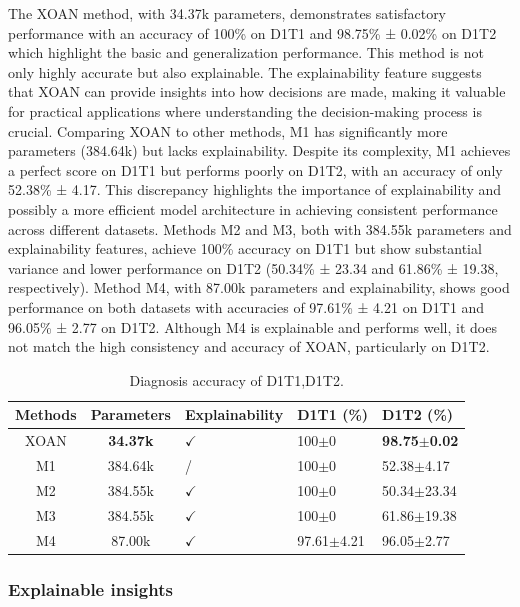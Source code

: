 \documentclass[lettersize,journal]{IEEEtran}
\begin{document}
The XOAN method, with 34.37k parameters, demonstrates satisfactory performance with an accuracy of 100\% on D1T1 and 98.75\% ± 0.02\% on D1T2 which highlight the basic and generalization performance. This method is not only highly accurate but also explainable. The explainability feature suggests that XOAN can provide insights into how decisions are made, making it valuable for practical applications where understanding the decision-making process is crucial. Comparing XOAN to other methods, M1 has significantly more parameters (384.64k) but lacks explainability. Despite its complexity, M1 achieves a perfect score on D1T1 but performs poorly on D1T2, with an accuracy of only 52.38\% ± 4.17. This discrepancy highlights the importance of explainability and possibly a more efficient model architecture in achieving consistent performance across different datasets. Methods M2 and M3, both with 384.55k parameters and explainability features, achieve 100\% accuracy on D1T1 but show substantial variance and lower performance on D1T2 (50.34\% ± 23.34 and 61.86\% ± 19.38, respectively). Method M4, with 87.00k parameters and explainability, shows good performance on both datasets with accuracies of 97.61\% ± 4.21 on D1T1 and 96.05\% ± 2.77 on D1T2. Although M4 is explainable and performs well, it does not match the high consistency and accuracy of XOAN, particularly on D1T2.

\begin{table}
    \centering
\caption{Diagnosis accuracy of D1T1,D1T2.}
\label{table.signaldomain}
    \begin{tabular}{cclll} \hline  
         Methods&    Parameters& Explainability& D1T1 (\%)&D1T2 (\%)\\ \hline  
         XOAN& \textbf{34.37k}& $\checkmark$& 100$\pm$0&\textbf{98.75$\pm$0.02}\\ 
         M1& 384.64k& /& 100$\pm$0&52.38$\pm$4.17\\ 
         M2& 384.55k& $\checkmark$& 100$\pm$0&50.34$\pm$23.34\\ \hline
 M3& 384.55k& $\checkmark$& 100$\pm$0&61.86$\pm$19.38\\
 M4& 87.00k& $\checkmark$& 97.61$\pm$4.21&96.05$\pm$2.77\\  \hline
    \end{tabular}
\end{table}




\subsubsection{Explainable insights}
\end{document}
